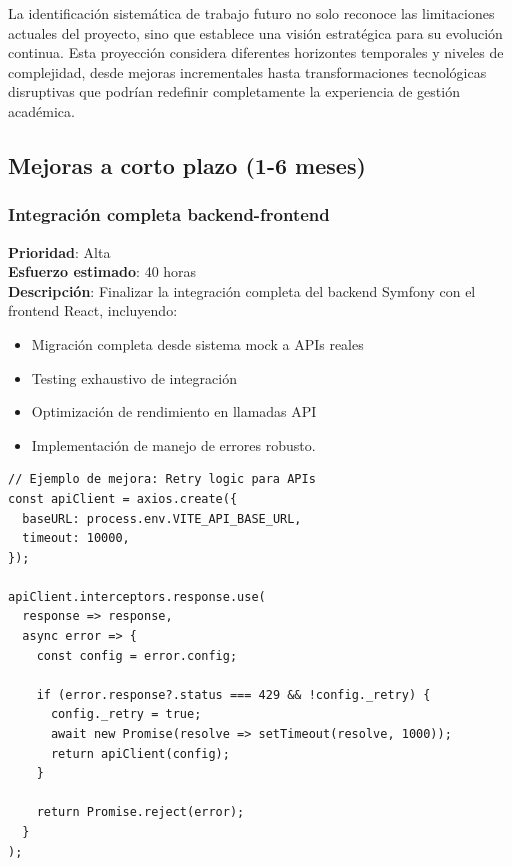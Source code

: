 \documentclass[12pt,a4paper,oneside]{report}
\providecommand{\tightlist}{%
  \setlength{\itemsep}{0pt}\setlength{\parskip}{0pt}}
\begin{document}
{La identificación sistemática de trabajo futuro no solo reconoce las
limitaciones actuales del proyecto, sino que establece una visión
estratégica para su evolución continua. Esta proyección considera
diferentes horizontes temporales y niveles de complejidad, desde mejoras
incrementales hasta transformaciones tecnológicas disruptivas que
podrían redefinir completamente la experiencia de gestión académica.

\subsection{Mejoras a corto plazo (1-6
meses)}\label{mejoras-a-corto-plazo-1-6-meses}

\subsubsection{Integración completa
backend-frontend}\label{integraciuxf3n-completa-backend-frontend}

\textbf{Prioridad}: Alta\\
\textbf{Esfuerzo estimado}: 40 horas\\
\textbf{Descripción}: Finalizar la integración completa del backend
Symfony con el frontend React, incluyendo:

\begin{itemize}
\tightlist
\item
  Migración completa desde sistema mock a APIs reales
\item
  Testing exhaustivo de integración
\item
  Optimización de rendimiento en llamadas API
\item
  Implementación de manejo de errores robusto.
\end{itemize}

\begin{lstlisting}
// Ejemplo de mejora: Retry logic para APIs
const apiClient = axios.create({
  baseURL: process.env.VITE_API_BASE_URL,
  timeout: 10000,
});

apiClient.interceptors.response.use(
  response => response,
  async error => {
    const config = error.config;
    
    if (error.response?.status === 429 && !config._retry) {
      config._retry = true;
      await new Promise(resolve => setTimeout(resolve, 1000));
      return apiClient(config);
    }
    
    return Promise.reject(error);
  }
);
\end{lstlisting}

}
\end{document}
